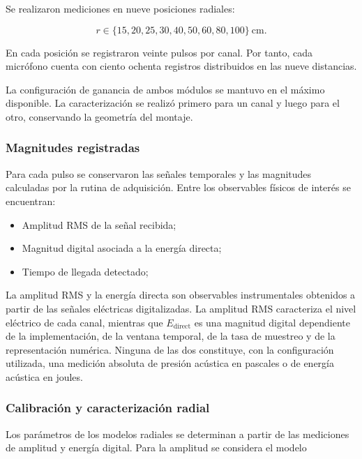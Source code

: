 Se realizaron mediciones en nueve posiciones radiales:

\begin{equation}
    r \in
    \{15,20,25,30,40,50,60,80,100\}
    \ \si{\centi\metre}.
\end{equation}

En cada posición se registraron veinte pulsos por canal.
Por tanto, cada micrófono cuenta con ciento ochenta
registros distribuidos en las nueve distancias.

La configuración de ganancia de ambos módulos se mantuvo
en el máximo disponible. La caracterización se realizó
primero para un canal y luego para el otro, conservando
la geometría del montaje.

\subsubsection{Magnitudes registradas}

Para cada pulso se conservaron las señales temporales
y las magnitudes calculadas por la rutina de adquisición.
Entre los observables físicos de interés se encuentran:

\begin{itemize}
    \item Amplitud RMS de la señal recibida;
    \item Magnitud digital asociada a la energía directa;
    \item Tiempo de llegada detectado;
\end{itemize}

La amplitud RMS y la energía directa son observables
instrumentales obtenidos a partir de las señales eléctricas
digitalizadas. La amplitud RMS caracteriza el nivel eléctrico
de cada canal, mientras que $E_{\mathrm{direct}}$ es una
magnitud digital dependiente de la implementación, de la
ventana temporal, de la tasa de muestreo y de la representación
numérica. Ninguna de las dos constituye, con la configuración
utilizada, una medición absoluta de presión acústica en
pascales o de energía acústica en joules.

\subsubsection{Calibración y caracterización radial}

Los parámetros de los modelos radiales se determinan
a partir de las mediciones de amplitud y energía digital.
Para la amplitud se considera el modelo

